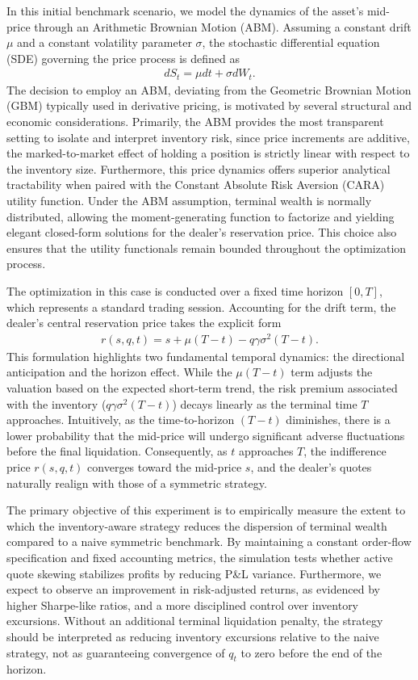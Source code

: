 \documentclass[a4paper,10pt,titlepage,oneside,openany]{book}
\theoremstyle{plain}\newtheorem{theorem}{Theorem}[chapter]
\theoremstyle{definition}\newtheorem{definition}{Definition}[chapter]
\theoremstyle{remark}\newtheorem{remark}{Remark}[chapter]
\begin{document}
In this initial benchmark scenario, we model the dynamics of the asset's mid-price through an Arithmetic Brownian Motion (ABM). Assuming a constant drift $\mu$ and a constant volatility parameter $\sigma$, the stochastic differential equation (SDE) governing the price process is defined as
\begin{align*}
    dS_t = \mu dt + \sigma dW_t.
\end{align*}
The decision to employ an ABM, deviating from the Geometric Brownian Motion (GBM) typically used in derivative pricing, is motivated by several structural and economic considerations. Primarily, the ABM provides the most transparent setting to isolate and interpret inventory risk, since price increments are additive, the marked-to-market effect of holding a position is strictly linear with respect to the inventory size. Furthermore, this price dynamics offers superior analytical tractability when paired with the Constant Absolute Risk Aversion (CARA) utility function. Under the ABM assumption, terminal wealth is normally distributed, allowing the moment-generating function to factorize and yielding elegant closed-form solutions for the dealer's reservation price. This choice also ensures that the utility functionals remain bounded throughout the optimization process.

The optimization in this case is conducted over a fixed time horizon $[0, T]$, which represents a standard trading session. Accounting for the drift term, the dealer's central reservation price takes the explicit form 
\begin{align*}
    r(s, q, t) = s + \mu(T-t) - q\gamma\sigma^2(T-t).
\end{align*}
This formulation highlights two fundamental temporal dynamics: the directional anticipation and the horizon effect. While the $\mu(T-t)$ term adjusts the valuation based on the expected short-term trend, the risk premium associated with the inventory ($q\gamma\sigma^2(T-t)$) decays linearly as the terminal time $T$ approaches. Intuitively, as the time-to-horizon $(T-t)$ diminishes, there is a lower probability that the mid-price will undergo significant adverse fluctuations before the final liquidation. Consequently, as $t$ approaches $T$, the indifference price $r(s, q, t)$ converges toward the mid-price $s$, and the dealer's quotes naturally realign with those of a symmetric strategy.

The primary objective of this experiment is to empirically measure the extent to which the inventory-aware strategy reduces the dispersion of terminal wealth compared to a naive symmetric benchmark. By maintaining a constant order-flow specification and fixed accounting metrics, the simulation tests whether active quote skewing stabilizes profits by reducing P\&L variance. Furthermore, we expect to observe an improvement in risk-adjusted returns, as evidenced by higher Sharpe-like ratios, and a more disciplined control over inventory excursions. Without an additional terminal liquidation penalty, the strategy should be interpreted as reducing inventory excursions relative to the naive strategy, not as guaranteeing convergence of $q_t$ to zero before the end of the horizon.
\end{document}
